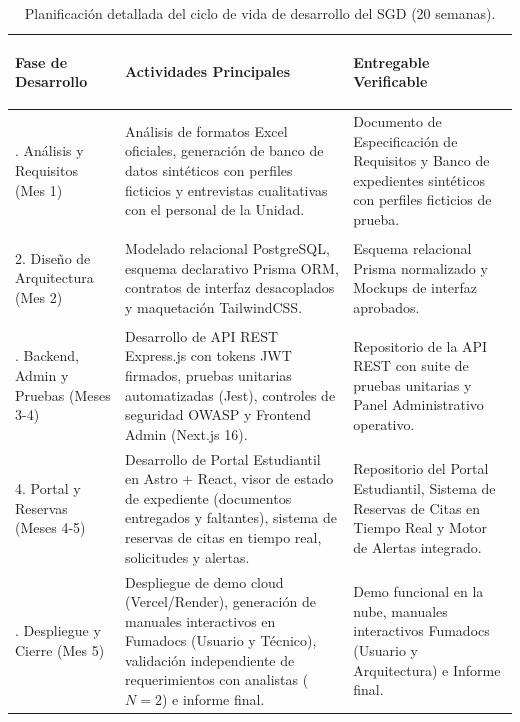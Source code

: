 \begin{table}[H]
    \centering
    \small
    \caption{Planificación detallada del ciclo de vida de desarrollo del SGD (20 semanas).}
    \label{tab:planificacion}
    \begin{tabularx}{\linewidth}{>{\bfseries\raggedright\arraybackslash}p{2.8cm} >{\raggedright\arraybackslash}X >{\raggedright\arraybackslash}X}
        \toprule
        \rowcolor{TableHeadBg}
        \color{white}\textbf{Fase de Desarrollo} & 
        \color{white}\textbf{Actividades Principales} & 
        \color{white}\textbf{Entregable Verificable} \\
        \midrule
        1. Análisis y Requisitos (Mes 1) & Análisis de formatos Excel oficiales, generación de banco de datos sintéticos con perfiles ficticios y entrevistas cualitativas con el personal de la Unidad. & Documento de Especificación de Requisitos y Banco de expedientes sintéticos con perfiles ficticios de prueba. \\
        \rowcolor{TableAltRow}
        2. Diseño de Arquitectura (Mes 2) & Modelado relacional PostgreSQL, esquema declarativo Prisma ORM, contratos de interfaz desacoplados y maquetación TailwindCSS. & Esquema relacional Prisma normalizado y Mockups de interfaz aprobados. \\
        3. Backend, Admin y Pruebas (Meses 3-4) & Desarrollo de API REST Express.js con tokens JWT firmados, pruebas unitarias automatizadas (Jest), controles de seguridad OWASP y Frontend Admin (Next.js 16). & Repositorio de la API REST con suite de pruebas unitarias y Panel Administrativo operativo. \\
        \rowcolor{TableAltRow}
        4. Portal y Reservas (Meses 4-5) & Desarrollo de Portal Estudiantil en Astro + React, visor de estado de expediente (documentos entregados y faltantes), sistema de reservas de citas en tiempo real, solicitudes y alertas. & Repositorio del Portal Estudiantil, Sistema de Reservas de Citas en Tiempo Real y Motor de Alertas integrado. \\
        5. Despliegue y Cierre (Mes 5) & Despliegue de demo cloud (Vercel/Render), generación de manuales interactivos en Fumadocs (Usuario y Técnico), validación independiente de requerimientos con analistas ($N = 2$) e informe final. & Demo funcional en la nube, manuales interactivos Fumadocs (Usuario y Arquitectura) e Informe final. \\
        \bottomrule
    \end{tabularx}
\end{table}
